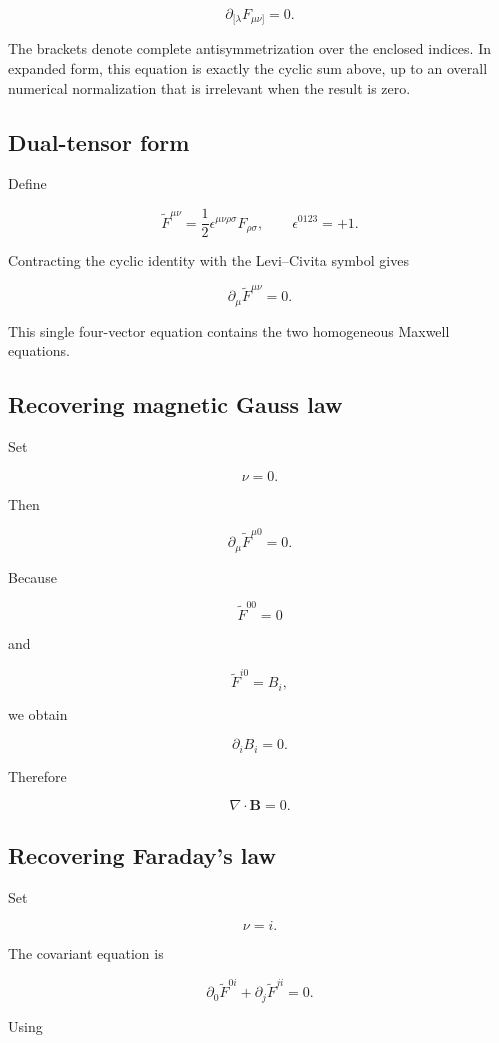 \[
\boxed{
\partial_{[\lambda}F_{\mu\nu]}=0
}.
\]

The brackets denote complete antisymmetrization over the enclosed indices. In expanded form, this equation is exactly the cyclic sum above, up to an overall numerical normalization that is irrelevant when the result is zero.

\subsection{Dual-tensor form}

Define

\[
\widetilde{F}^{\mu\nu}
=
\frac{1}{2}
\epsilon^{\mu\nu\rho\sigma}
F_{\rho\sigma},
\qquad
\epsilon^{0123}=+1.
\]

Contracting the cyclic identity with the Levi--Civita symbol gives

\[
\boxed{
\partial_{\mu}
\widetilde{F}^{\mu\nu}
=0
}.
\]

This single four-vector equation contains the two homogeneous Maxwell equations.

\subsection{Recovering magnetic Gauss law}

Set

\[
\nu=0.
\]

Then

\[
\partial_{\mu}
\widetilde{F}^{\mu0}
=0.
\]

Because

\[
\widetilde{F}^{00}=0
\]

and

\[
\widetilde{F}^{i0}=B_i,
\]

we obtain

\[
\partial_iB_i=0.
\]

Therefore

\[
\boxed{
\nabla\cdot\mathbf{B}=0
}.
\]

\subsection{Recovering Faraday's law}

Set

\[
\nu=i.
\]

The covariant equation is

\[
\partial_0
\widetilde{F}^{0i}
+
\partial_j
\widetilde{F}^{ji}
=0.
\]

Using

